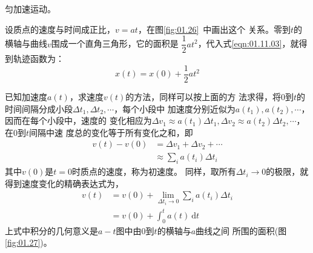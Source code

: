 \example 匀加速运动。

设质点的速度与时间成正比，$v=at$，在图\ref{fig:01.26}~中画出这个
关系。零到$t$的横轴与曲线$v$围成一个直角三角形，它的面积是
$\dfrac{1}{2} a t^2$，代入式\eqref{eqn:01.11.03}，就得到轨迹函数为：
\begin{equation*}\label{eqn:01.11.04i}
 x\left(t\right)=x\left(0\right)+\frac{1}{2}at^2 \tag{1.11.4$'$}
\end{equation*}

已知加速度$a\left(t\right)$，求速度$v\left(t\right)$的方法，同样可以按上面的方
法求得，将0到$t$的时间间隔分成小段$\Delta t_1 , \Delta t_2 , \cdots$，每个小段中
加速度分别近似为$a\left(t_1\right) , a\left(t_2\right) , \cdots$，因而在每个小段中，速度的
变化相应为$\Delta v_1\approx a\left(t_1\right)\Delta t_1 , \Delta v_2\approx a\left(t_2\right)\Delta t_2 , \cdots$，在0到$t$间隔中速
度总的变化等于所有变化之和，即
\begin{equation}\label{eqn:01.11.05}
 \begin{aligned}
 v\left(t\right)-v\left(0\right) & =\Delta v_{1}+\Delta v_{2}+\cdots \\
 & \approx \sum_{i} a\left(t_{i}\right) \Delta t_{i}
 \end{aligned}
\end{equation}
其中$v\left(0\right)$是$t=0$时质点的速度，称为初速度。
同样，取所有$\Delta t _ i \to 0$的极限，就得到速度变化的精确表达式为，
\begin{equation}\label{eqn:01.11.06}
 \begin{aligned}
 v\left(t\right) & =v\left(0\right)+\lim _{\Delta t_{i} \rightarrow 0} \sum_ i a\left(t_{i}\right) \Delta t_{i} \\
 & =v\left(0\right)+\int_{0}^{t} a\left(t\right) {~\mathrm d} t
 \end{aligned}
\end{equation}
上式中积分的几何意义是$a-t$图中由0到$t$的横轴与$a$曲线之间
所围的面积(图\ref{fig:01.27})。

